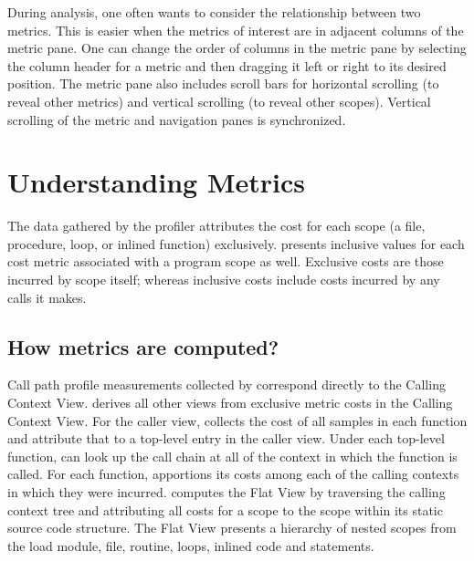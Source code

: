  During analysis, one often wants to consider the relationship between two metrics. This is easier when the metrics of interest are in adjacent columns of the metric pane. One can change the order of columns in the metric pane by selecting the column header for a metric and then dragging it left or right to its desired position. The metric pane also includes scroll bars for horizontal scrolling (to reveal other metrics) and vertical scrolling (to reveal other scopes). Vertical scrolling of the metric and navigation panes is synchronized.



\section{Understanding Metrics}

 The data gathered by the profiler attributes the cost for each scope (a file, procedure, loop, or inlined function) exclusively.
\hpcviewer{} presents inclusive values for each cost metric associated with a program scope as well.
Exclusive costs are those incurred by scope itself; whereas inclusive costs include costs incurred by any calls it makes.


\subsection{How metrics are computed?}

Call path profile measurements collected by \hpcrun{} correspond directly to the Calling Context View.
\hpcviewer{} derives all other views from exclusive metric costs in the Calling Context View.
For the caller view, \hpcviewer{} collects the cost of all samples in each function and attribute that to a top-level entry in the caller view.
Under each top-level function, \hpcviewer{} can look up the call chain at all of the context in which the function is called.
For each function, \hpcviewer{} apportions its costs among each of the calling contexts in which they were incurred.
\hpcviewer{} computes the Flat View by traversing the calling context tree and attributing all costs for a scope to the scope within its static source code structure.
The Flat View presents a hierarchy of nested scopes from the load module, file, routine, loops, inlined code and statements.



